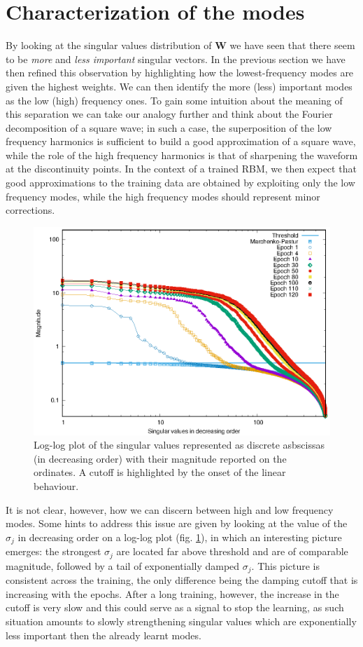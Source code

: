 \documentclass[notitlepage]{revtex4-1}
\begin{document}
\section{Characterization of the modes}
By looking at the singular values distribution of \(\mathbf{W}\) we have seen that there seem to be \textit{more} and \textit{less important} singular vectors. In the previous section we have then refined this observation by highlighting how the lowest-frequency modes are given the highest weights. We can then identify the more (less) important modes as the low (high) frequency ones. To gain some intuition about the meaning of this separation we can take our analogy further and think about the Fourier decomposition of a square wave; in such a case, the superposition of the low frequency harmonics is sufficient to build a good approximation of a square wave, while the role of the high frequency harmonics is that of sharpening the waveform at the discontinuity points. In the context of a trained RBM, we then expect that good approximations to the training data are obtained by exploiting only the low frequency modes, while the high frequency modes should represent minor corrections.

\begin{figure}
  \includegraphics{SV_pl.eps}
  \caption{Log-log plot of the singular values represented as discrete asbscissas (in decreasing order) with their magnitude reported on the ordinates. A cutoff is highlighted by the onset of the linear behaviour.}
  \label{fig:sv_pl}
\end{figure}

It is not clear, however, how we can discern between high and low frequency modes. Some hints to address this issue are given by looking at the value of the \(\sigma_j\) in decreasing order on a log-log plot (fig. \ref{fig:sv_pl}), in which an interesting picture emerges: the strongest \(\sigma_j\) are located far above threshold and are of comparable magnitude, followed by a tail of exponentially damped \(\sigma_j\). This picture is consistent across the training, the only difference being the damping cutoff that is increasing with the epochs. After a long training, however, the increase in the cutoff is very slow and this could serve as a signal to stop the learning, as such situation amounts to slowly strengthening singular values which are exponentially less important then the already learnt modes.
\end{document}
